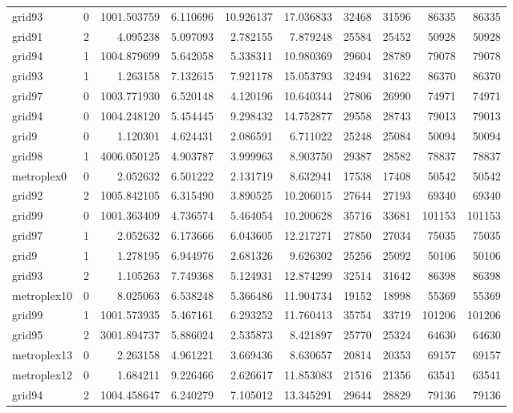 \begin{longtable}{|l|r|r|r|r|r|r|r|r|r|}
grid93 & 0 & 1001.503759 & 6.110696 & 10.926137 & 17.036833 & 32468 & 31596 & 86335 & 86335 \\
grid91 & 2 & 4.095238 & 5.097093 & 2.782155 & 7.879248 & 25584 & 25452 & 50928 & 50928 \\
grid94 & 1 & 1004.879699 & 5.642058 & 5.338311 & 10.980369 & 29604 & 28789 & 79078 & 79078 \\
grid93 & 1 & 1.263158 & 7.132615 & 7.921178 & 15.053793 & 32494 & 31622 & 86370 & 86370 \\
grid97 & 0 & 1003.771930 & 6.520148 & 4.120196 & 10.640344 & 27806 & 26990 & 74971 & 74971 \\
grid94 & 0 & 1004.248120 & 5.454445 & 9.298432 & 14.752877 & 29558 & 28743 & 79013 & 79013 \\
grid9 & 0 & 1.120301 & 4.624431 & 2.086591 & 6.711022 & 25248 & 25084 & 50094 & 50094 \\
grid98 & 1 & 4006.050125 & 4.903787 & 3.999963 & 8.903750 & 29387 & 28582 & 78837 & 78837 \\
metroplex0 & 0 & 2.052632 & 6.501222 & 2.131719 & 8.632941 & 17538 & 17408 & 50542 & 50542 \\
grid92 & 2 & 1005.842105 & 6.315490 & 3.890525 & 10.206015 & 27644 & 27193 & 69340 & 69340 \\
grid99 & 0 & 1001.363409 & 4.736574 & 5.464054 & 10.200628 & 35716 & 33681 & 101153 & 101153 \\
grid97 & 1 & 2.052632 & 6.173666 & 6.043605 & 12.217271 & 27850 & 27034 & 75035 & 75035 \\
grid9 & 1 & 1.278195 & 6.944976 & 2.681326 & 9.626302 & 25256 & 25092 & 50106 & 50106 \\
grid93 & 2 & 1.105263 & 7.749368 & 5.124931 & 12.874299 & 32514 & 31642 & 86398 & 86398 \\
metroplex10 & 0 & 8.025063 & 6.538248 & 5.366486 & 11.904734 & 19152 & 18998 & 55369 & 55369 \\
grid99 & 1 & 1001.573935 & 5.467161 & 6.293252 & 11.760413 & 35754 & 33719 & 101206 & 101206 \\
grid95 & 2 & 3001.894737 & 5.886024 & 2.535873 & 8.421897 & 25770 & 25324 & 64630 & 64630 \\
metroplex13 & 0 & 2.263158 & 4.961221 & 3.669436 & 8.630657 & 20814 & 20353 & 69157 & 69157 \\
metroplex12 & 0 & 1.684211 & 9.226466 & 2.626617 & 11.853083 & 21516 & 21356 & 63541 & 63541 \\
grid94 & 2 & 1004.458647 & 6.240279 & 7.105012 & 13.345291 & 29644 & 28829 & 79136 & 79136 \\

\end{longtable}

